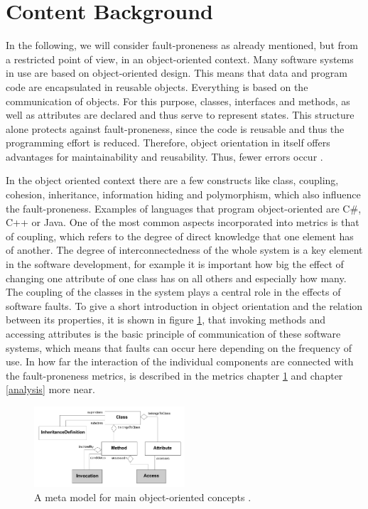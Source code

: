 \section{Content Background}\label{content}

In the following, we will consider fault-proneness as already mentioned, but from a restricted point of view, in an object-oriented context. Many software systems in use are based on object-oriented design. This means that data and program code are encapsulated in reusable objects. Everything is based on the communication of objects. For this purpose, classes, interfaces and methods, as well as attributes are declared and thus serve to represent states. This structure alone protects against fault-proneness, since the code is reusable and thus the programming effort is reduced. Therefore, object orientation in itself offers advantages for maintainability and reusability. Thus, fewer errors occur \cite{fichman1993adoption, lanza2002beyond}. 

In the object oriented context there are a few constructs like class, coupling, cohesion, inheritance, information hiding and polymorphism, which also influence the fault-proneness. Examples of languages that program object-oriented are C\#, C++ or Java.
One of the most common aspects incorporated into metrics is that of coupling, which refers to the degree of direct knowledge that one element has of another. The degree of interconnectedness of the whole system is a key element in the software development, for example it is important how big the effect of changing one attribute of one class has on all others and especially how many.
The coupling of the classes in the system plays a central role in the effects of software faults.
To give a short introduction in object orientation and the relation between its properties, it is shown in figure \ref{fig0}, that invoking methods and accessing attributes is the basic principle of communication of these software systems, which means that faults can occur here depending on the frequency of use. In how far the interaction of the individual components are connected with the fault-proneness metrics, is described in the metrics chapter \ref{content} and chapter \ref{analysis} more near.

\begin{figure}[htbp]
	\centerline{\includegraphics[width=0.5\textwidth]{pictures/oodesign.png}}
	\caption{A meta model for main object-oriented concepts \cite{lanza2002beyond}.}
	\label{fig0}
\end{figure}

